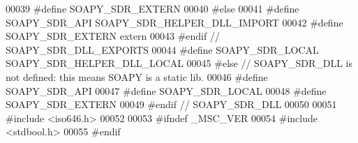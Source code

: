 \begin{DoxyCode}
00039 \textcolor{preprocessor}{    #define SOAPY\_SDR\_EXTERN}
00040 \textcolor{preprocessor}{  #else}
00041 \textcolor{preprocessor}{    #define SOAPY\_SDR\_API SOAPY\_SDR\_HELPER\_DLL\_IMPORT}
00042 \textcolor{preprocessor}{    #define SOAPY\_SDR\_EXTERN extern}
00043 \textcolor{preprocessor}{  #endif // SOAPY\_SDR\_DLL\_EXPORTS}
00044 \textcolor{preprocessor}{  #define SOAPY\_SDR\_LOCAL SOAPY\_SDR\_HELPER\_DLL\_LOCAL}
00045 \textcolor{preprocessor}{#else // SOAPY\_SDR\_DLL is not defined: this means SOAPY is a static lib.}
00046 \textcolor{preprocessor}{  #define SOAPY\_SDR\_API}
00047 \textcolor{preprocessor}{  #define SOAPY\_SDR\_LOCAL}
00048 \textcolor{preprocessor}{  #define SOAPY\_SDR\_EXTERN}
00049 \textcolor{preprocessor}{#endif // SOAPY\_SDR\_DLL}
00050 
00051 \textcolor{preprocessor}{#include <iso646.h>}
00052 
00053 \textcolor{preprocessor}{#ifndef \_MSC\_VER}
00054 \textcolor{preprocessor}{#include <stdbool.h>}
00055 \textcolor{preprocessor}{#endif}
\end{DoxyCode}
